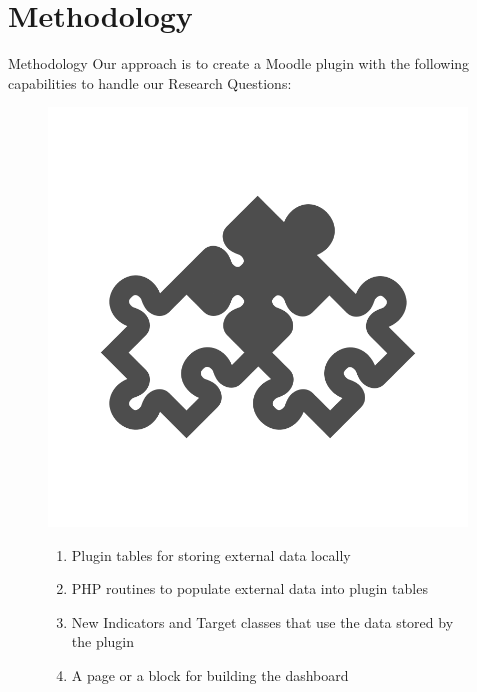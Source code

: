 \section{Methodology}

\begin{frame}{Methodology}
    Our approach is to create a Moodle plugin with the following capabilities to handle our Research Questions:

    \begin{figure}
        \centering
        \begin{minipage}{.3\textwidth}
          \centering
          \includegraphics[width=0.99\textwidth]{../../images/quebracabeca.png}
        \end{minipage}%
        \begin{minipage}{.7\textwidth}
            \begin{enumerate}[<alert@+>]\color{gray}
                \item Plugin tables for storing external data locally
                \item PHP routines to populate external data into plugin tables
                \item New Indicators and Target classes that use the data stored by the plugin
                \item A page or a block for building the dashboard
            \end{enumerate}
        \end{minipage}
    \end{figure}
\end{frame}


